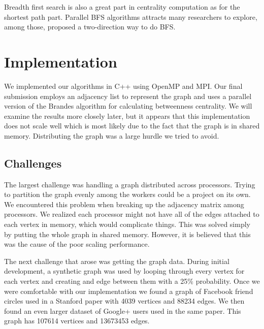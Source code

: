 \documentclass[11pt,a4paper,titlepage]{article}
\begin{document}
Breadth first search is also a great part in centrality computation as for the
shortest path part. Parallel BFS algorithms attracts many researchers to
explore, among those, \cite{beamer2013direction} proposed a two-direction way
to do BFS.



\section{Implementation} %
\label{sec:data}

We implemented our algorithms in C++ using OpenMP and MPI. Our final submission
employs an adjacency list to represent the graph and uses a parallel version
of the Brandes algorithm for calculating betweenness centrality. We will
examine the results more closely later, but it appears that this implementation
does not scale well which is most likely due to the fact that the graph is in
shared memory. Distributing the graph was a large hurdle we tried to avoid.


\subsection{Challenges}

The largest challenge was handling a graph distributed across processors.
Trying to partition the graph evenly among the workers could be a project on
its own. We encountered this problem when breaking up the adjacency matrix
among processors. We realized each processor might not have all of the edges
attached to each vertex in memory, which would complicate things. This was
solved simply by putting the whole graph in shared memory. However, it is
believed that this was the cause of the poor scaling performance.

The next challenge that arose was getting the graph data. During initial
development, a synthetic graph was used by looping through every vertex for
each vertex and creating and edge between them with a 25\% probability. Once we
were comfortable with our implementation we found a graph of Facebook friend
circles used in a Stanford paper \cite{leskovec2012learning} with 4039 vertices
and 88234 edges. We then found an even larger dataset of Google+ users used in
the same paper. This graph has 107614 vertices and 13673453 edges.
\end{document}
